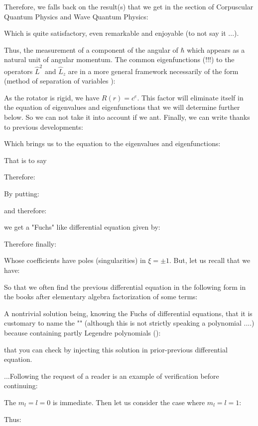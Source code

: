 	Therefore, we falls back on the result(s) that we get in the section of Corpuscular Quantum Physics and Wave Quantum Physics:
	
	Which is quite satisfactory, even remarkable and enjoyable (to not say it ...).
	
	Thus, the measurement of a component of the angular of $\hbar$ which appears as a natural unit of angular momentum.
	The common eigenfunctions (!!!) to the operators $\hat{L}^2$ and $\hat{L}_z$ are in a more general framework necessarily of the form (method of separation of variables ):
	
	As the rotator is rigid, we have $R(r)=c^{e}$. This factor will eliminate itself in the equation of eigenvalues and eigenfunctions that we will determine further below. So we can not take it into account if we ant. Finally, we can write thanks to previous developments:
	
	Which brings us to the equation to the eigenvalues and eigenfunctions:
	
	That is to say
	
	Therefore:
	
	By putting:
	
	and therefore:
	
	we get a "Fuchs" like differential equation given by:
	
	Therefore finally:
	
	Whose coefficients have poles (singularities) in $\xi=\pm 1$. But, let us recall that we have:
	
	So that we often find the previous differential equation in the following form in the books after elementary algebra factorization of some terms:
	
	A nontrivial solution being, knowing the Fuchs of differential equations, that it is customary to name the "\label{legendre polynomial}" (although this is not strictly speaking a polynomial ....) because containing partly Legendre polynomials ():
	
	that you can check by injecting this solution in prior-previous differential equation.
	
	...Following the request of a reader is an example of verification before continuing:
	
	The $m_l=l=0$ is immediate. Then let us consider the case where $m_l=l=1$:
	
	Thus:
	
